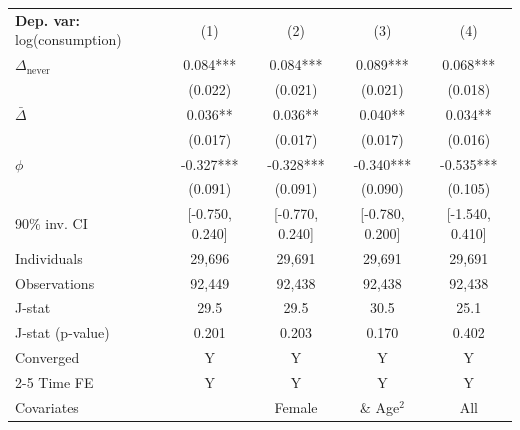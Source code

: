 \begin{tabular}{l cccc} \toprule  \textbf{Dep. var:}  log(consumption) 
                    &\multicolumn{1}{c}{(1)}   &\multicolumn{1}{c}{(2)}   &\multicolumn{1}{c}{(3)}   &\multicolumn{1}{c}{(4)}   \\

\addlinespace
$\Delta_{\text{never}}$&       0.084***&       0.084***&       0.089***&       0.068***\\
                    &     (0.022)   &     (0.021)   &     (0.021)   &     (0.018)   \\

\addlinespace
$\bar{\Delta}$      &       0.036** &       0.036** &       0.040** &       0.034** \\
                    &     (0.017)   &     (0.017)   &     (0.017)   &     (0.016)   \\

\addlinespace
$\phi$              &      -0.327***&      -0.328***&      -0.340***&      -0.535***\\
                    &     (0.091)   &     (0.091)   &     (0.090)   &     (0.105)   \\
90\% inv. CI        &[-0.750, 0.240]   &[-0.770, 0.240]   &[-0.780, 0.200]   &[-1.540, 0.410]   \\
Individuals         &      29,696   &      29,691   &      29,691   &      29,691   \\
Observations        &      92,449   &      92,438   &      92,438   &      92,438   \\
J-stat              &        29.5   &        29.5   &        30.5   &        25.1   \\
J-stat (p-value)    &       0.201   &       0.203   &       0.170   &       0.402   \\
Converged           &           Y   &           Y   &           Y   &           Y   \\
\cmidrule{2-5} Time FE & Y & Y & Y & Y \\ Covariates & & Female & \& Age$^2$ & All \\ \bottomrule \end{tabular}
